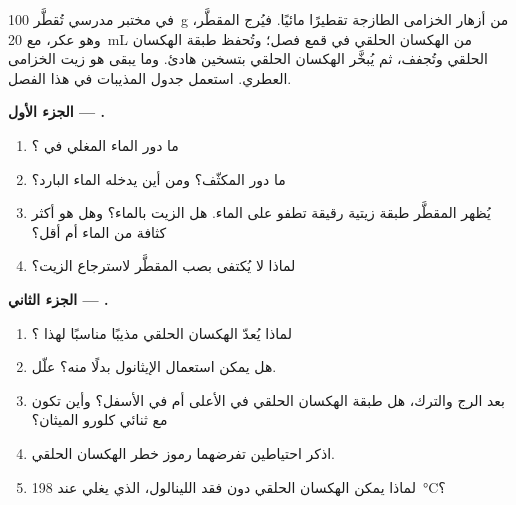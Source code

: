 \begin{problem}
\label{pb:g10:chemical-species:1}
في مختبر مدرسي تُقطَّر \qty{100}{g} من أزهار الخزامى الطازجة تقطيرًا مائيًا.
فيُرج المقطَّر، وهو عكر، مع \qty{20}{mL} من الهكسان الحلقي في قمع فصل؛
وتُحفظ طبقة الهكسان الحلقي وتُجفف، ثم يُبخَّر الهكسان الحلقي بتسخين هادئ. وما
يبقى هو زيت الخزامى العطري. استعمل جدول المذيبات في هذا
الفصل.

\medskip
\noindent\textbf{الجزء الأول --- .}
\begin{enumerate}
  \item ما دور الماء المغلي في ؟
  \item ما دور المكثّف؟ ومن أين يدخله الماء
        البارد؟
  \item يُظهر المقطَّر طبقة زيتية رقيقة تطفو على الماء. هل الزيت  بالماء؟ وهل هو أكثر كثافة من الماء أم أقل؟
  \item لماذا لا يُكتفى بصب المقطَّر لاسترجاع الزيت؟
\end{enumerate}

\medskip
\noindent\textbf{الجزء الثاني --- .}
\begin{enumerate}[resume]
  \item لماذا يُعدّ الهكسان الحلقي مذيبًا مناسبًا لهذا ؟
  \item هل يمكن استعمال الإيثانول بدلًا منه؟ علّل.
  \item بعد الرج والترك، هل طبقة الهكسان الحلقي في الأعلى أم في
        الأسفل؟ وأين تكون مع ثنائي كلورو الميثان؟
  \item اذكر احتياطين تفرضهما رموز خطر الهكسان الحلقي.
  \item لماذا يمكن  الهكسان الحلقي دون فقد اللينالول، الذي يغلي
        عند \qty{198}{\celsius}؟
\end{enumerate}


\end{problem}
